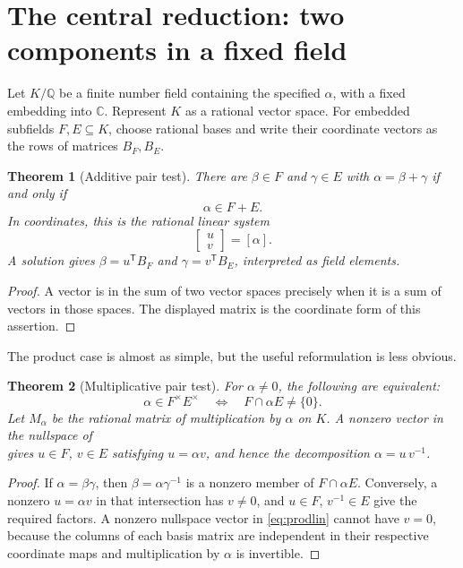 \documentclass[11pt,a4paper]{article}
\newcommand{\Q}{\mathbb Q}
\newcommand{\C}{\mathbb C}
\newtheorem{theorem}{Theorem}[section]
\theoremstyle{remark}\newtheorem{remark}[theorem]{Remark}
\begin{document}
\section{The central reduction: two components in a fixed field}
\label{sec:linear}
Let $K/\Q$ be a finite number field containing the specified $\alpha$, with a fixed embedding into $\C$. Represent $K$ as a rational vector space. For embedded subfields $F,E\subseteq K$, choose rational bases and write their coordinate vectors as the rows of matrices $B_F,B_E$.

\begin{theorem}[Additive pair test]
There are $\beta\in F$ and $\gamma\in E$ with $\alpha=\beta+\gamma$ if and only if
\[
 \alpha\in F+E.
\]
In coordinates, this is the rational linear system
\begin{equation}
 [\,B_F^{\mathsf T}\; B_E^{\mathsf T}\,]
 \begin{bmatrix}u\\v\end{bmatrix}=[\alpha].
 \label{eq:sumlin}
\end{equation}
A solution gives $\beta=u^{\mathsf T}B_F$ and $\gamma=v^{\mathsf T}B_E$, interpreted as field elements.
\end{theorem}
\begin{proof}
A vector is in the sum of two vector spaces precisely when it is a sum of vectors in those spaces. The displayed matrix is the coordinate form of this assertion.
\end{proof}

The product case is almost as simple, but the useful reformulation is less obvious.
\begin{theorem}[Multiplicative pair test]
\label{thm:productlinear}
For $\alpha\ne0$, the following are equivalent:
\[
 \alpha\in F^\times E^\times
 \quad\Longleftrightarrow\quad
 F\cap\alpha E\ne\{0\}.
\]
Let $M_\alpha$ be the rational matrix of multiplication by $\alpha$ on $K$. A nonzero vector in the nullspace of
\begin{equation}
 [\,B_F^{\mathsf T}\;-M_\alpha B_E^{\mathsf T}\,]
 \label{eq:prodlin}
\end{equation}
gives $u\in F$, $v\in E$ satisfying $u=\alpha v$, and hence the decomposition $\alpha=u\,v^{-1}$.
\end{theorem}
\begin{proof}
If $\alpha=\beta\gamma$, then $\beta=\alpha\gamma^{-1}$ is a nonzero member of $F\cap\alpha E$. Conversely, a nonzero $u=\alpha v$ in that intersection has $v\ne0$, and $u\in F$, $v^{-1}\in E$ give the required factors. A nonzero nullspace vector in \eqref{eq:prodlin} cannot have $v=0$, because the columns of each basis matrix are independent in their respective coordinate maps and multiplication by $\alpha$ is invertible.
\end{proof}
\end{document}
